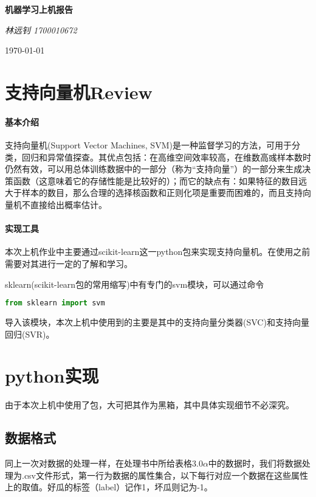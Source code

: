 \documentclass[UTF8]{ctexart}
\begin{document}
	\begin{titlepage}
		\vspace*{\fill}
		\begin{center}
			\normalfont
			{\Huge \bfseries 机器学习上机报告}
			
			\bigskip
			
			{\Large \itshape 林远钊 1700010672}
			
			\medskip
			
			\today
		\end{center}
	\end{titlepage}
	\newpage
	\tableofcontents
	
	\newpage
\section{支持向量机Review}
\paragraph{基本介绍}支持向量机(Support Vector Machines, SVM)是一种监督学习的方法，可用于分类，回归和异常值探查。其优点包括：在高维空间效率较高，在维数高彧样本数时仍然有效，可以用总体训练数据中的一部分（称为“支持向量”）的一部分来生成决策函数（这意味着它的存储性能是比较好的）；而它的缺点有：如果特征的数目远大于样本的数目，那么合理的选择核函数和正则化项是重要而困难的，而且支持向量机不直接给出概率估计。

\paragraph{实现工具}本次上机作业中主要通过scikit-learn这一python包来实现支持向量机。在使用之前需要对其进行一定的了解和学习。

sklearn(scikit-learn包的常用缩写)中有专门的svm模块，可以通过命令
\begin{lstlisting}[language= python]
from sklearn import svm
\end{lstlisting}
导入该模块，本次上机中使用到的主要是其中的支持向量分类器(SVC)和支持向量回归(SVR)。

\newpage
\section{python实现}
由于本次上机中使用了包，大可把其作为黑箱，其中具体实现细节不必深究。

\subsection{数据格式}
同上一次对数据的处理一样，在处理书中所给表格3.0$\alpha$中的数据时，我们将数据处理为.csv文件形式，第一行为数据的属性集合，以下每行对应一个数据在这些属性上的取值。好瓜的标签（label）记作1，坏瓜则记为-1。
\end{document}
